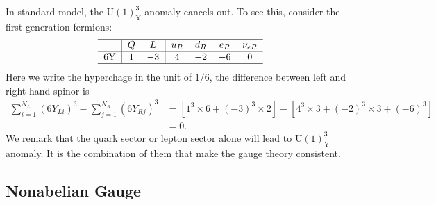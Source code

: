 \documentclass[aps,prb,superscriptaddress,nofootinbib]{revtex4}
\begin{document}
In standard model, the $\mathrm{U}(1)_{\mathrm{Y}}^3$ anomaly cancels out.
To see this, consider the first generation fermions:
\begin{equation}
\begin{tabular}{c|cc|cccc}
	\hline
	   & $Q$ & $L$  & $u_R$ & $d_R$ & $e_R$ & $\nu_{eR}$ \\ \hline
	6Y & $1$ & $-3$ & $4$   & $-2$  & $-6$  & $0$        \\
	\hline
\end{tabular}
\end{equation}
Here we write the hyperchage in the unit of $1/6$, the difference between left and right hand spinor is
\begin{equation}
\begin{aligned}
	\sum_{i=1}^{N_L} (6Y_{Li})^3 - \sum_{j=1}^{N_R} (6Y_{Rj})^3 
	&= \left[1^3 \times 6 + (-3)^3 \times 2 \right] -
	\left[4^3 \times 3 + (-2)^3 \times 3 + (-6)^3 \right] \\
	&= 0.
\end{aligned}
\end{equation}
We remark that the quark sector or lepton sector alone will lead to $\mathrm{U}(1)_{\mathrm{Y}}^3$ anomaly.
It is the combination of them that make the gauge theory consistent.




\subsection{Nonabelian Gauge}
\end{document}
